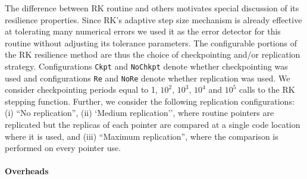 \documentclass{sig-alternate}
\begin{document}
The difference between RK routine and others motivates special discussion of its resilience properties.
Since RK's adaptive step size mechanism is already effective at tolerating many numerical errors we used it as the error detector for this routine without adjusting its tolerance parameters.
The configurable portions of the RK resilience method are thus the choice of checkpointing and/or replication strategy.
Configurations \texttt{Ckpt} and \texttt{NoChkpt} denote whether checkpointing was used and configurations \texttt{Re} and \texttt{NoRe} denote whether replication was used.
We consider checkpointing periods equal to 1, $10^2$, $10^3$, $10^4$ and $10^5$ calls to the RK stepping function.
Further, we consider the following replication configurations: (i) ``No replication'', (ii) `Medium replication'', where routine pointers are replicated but the replicas of each pointer are compared at a single code location where it is used, and (iii) ``Maximum replication'', where the comparison is performed on every pointer use.

\paragraph{Overheads}


\end{document}

